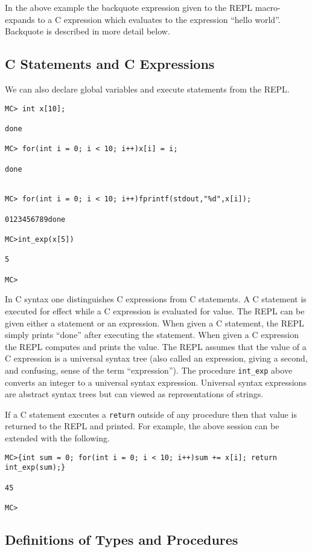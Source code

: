 \documentclass{article}
\begin{document}
In the above example the backquote expression given to the REPL macro-expands to a C expression which evaluates to the expression ``hello world''.
Backquote is described in more detail below.

\subsection{C Statements and C Expressions}

We can also declare global variables and execute statements from the REPL.

\begin{verbatim}
MC> int x[10];

done

MC> for(int i = 0; i < 10; i++)x[i] = i;

done


MC> for(int i = 0; i < 10; i++)fprintf(stdout,"%d",x[i]);

0123456789done

MC>int_exp(x[5])

5

MC>
\end{verbatim}

In C syntax one distinguishes C expressions from C statements.  A C
statement is executed for effect while a C expression is evaluated for
value. The REPL can be given either a statement or an expression.  When
given a C statement, the REPL simply prints ``done'' after executing
the statement.
When given a C expression the REPL computes and prints
the value.  The REPL assumes that the value of a C expression
is a universal syntax tree (also called an expression, giving a second, and confusing,
sense of the term ``expression''). The procedure {\tt int\_exp} above
converts an integer to a universal syntax expression.  Universal syntax expressions are abstract
syntax trees but can viewed as representations of strings.

If a C statement executes a {\tt return} outside of any
procedure then that value is returned to the REPL and printed.
For example, the above session can be extended with the following.

\begin{verbatim}
MC>{int sum = 0; for(int i = 0; i < 10; i++)sum += x[i]; return int_exp(sum);}

45

MC>
\end{verbatim}

\subsection{Definitions of Types and Procedures}
\end{document}
